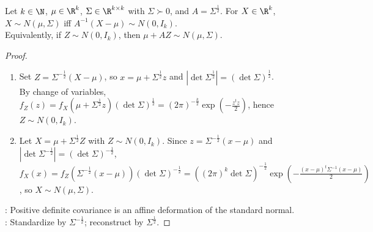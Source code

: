 \begin{proposition} \label{prop:multivariate-normal-affine-standardization} \\
Let $k\in\N$, $\mu\in\R^k$, $\Sigma\in\R^{k\times k}$ with $\Sigma\succ0$, and $A=\Sigma^{\frac{1}{2}}$. For $X\in\R^k$, $X\sim N(\mu,\Sigma)$ iff $A^{-1}(X-\mu)\sim N(0,I_k)$.\\
Equivalently, if $Z\sim N(0,I_k)$, then $\mu+AZ\sim N(\mu,\Sigma)$.
\begin{proof}
\begin{enumerate}[label=\roman*.]
\setlength{\itemsep}{0pt}
\item[$(\Rightarrow)$] Set $Z=\Sigma^{-\frac{1}{2}}(X-\mu)$, so $x=\mu+\Sigma^{\frac{1}{2}}z$ and $|\det\Sigma^{\frac{1}{2}}|=(\det\Sigma)^{\frac{1}{2}}$.\\
By change of variables, $f_Z(z)=f_X(\mu+\Sigma^{\frac{1}{2}}z)(\det\Sigma)^{\frac{1}{2}}=(2\pi)^{-\frac{k}{2}}\exp(-\frac{z^tz}{2})$, hence $Z\sim N(0,I_k)$.
\item[$(\Leftarrow)$] Let $X=\mu+\Sigma^{\frac{1}{2}}Z$ with $Z\sim N(0,I_k)$. Since $z=\Sigma^{-\frac{1}{2}}(x-\mu)$ and $|\det\Sigma^{-\frac{1}{2}}|=(\det\Sigma)^{-\frac{1}{2}}$,\\
$f_X(x)=f_Z(\Sigma^{-\frac{1}{2}}(x-\mu))(\det\Sigma)^{-\frac{1}{2}}=((2\pi)^k\det\Sigma)^{-\frac{1}{2}}\exp(-\frac{(x-\mu)^t\Sigma^{-1}(x-\mu)}{2})$, so $X\sim N(\mu,\Sigma)$.
\end{enumerate}
: Positive definite covariance is an affine deformation of the standard normal.\\
: Standardize by $\Sigma^{-\frac{1}{2}}$; reconstruct by $\Sigma^{\frac{1}{2}}$.
\end{proof}
\end{proposition}

